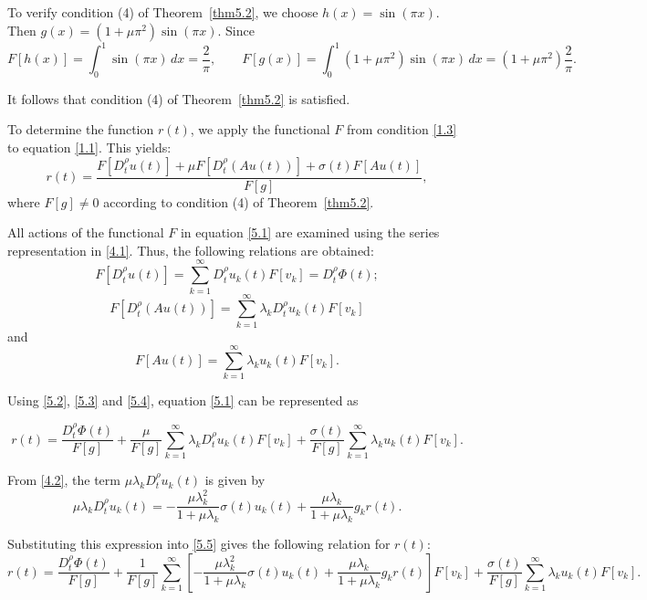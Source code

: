 \documentclass[reqno]{amsart}
\theoremstyle{definition}
\numberwithin{equation}{section}
\begin{document}
To verify condition (4) of Theorem~\ref{thm5.2}, we choose $h(x)=\sin(\pi x)$. Then $g(x)=(1+\mu\pi^2)\sin(\pi x)$. Since
$$
F[h(x)]=\int_0^1 \sin(\pi x)\,dx=\frac{2}{\pi}, \qquad F[g(x)]=\int_0^1 (1+\mu\pi^2)\sin(\pi x)\,dx=(1+\mu\pi^2)\frac{2}{\pi}.
$$

It follows that condition (4) of Theorem~\ref{thm5.2} is satisfied.

To determine the function $r(t)$, we apply the functional $F$ from condition \eqref{1.3} to equation \eqref{1.1}. This yields:
\begin{equation} \label{5.1}
 r(t)=\frac{F\left[D_t^\rho u(t)\right]+\mu F\left[D_t^\rho(A u(t))\right]+\sigma(t) F[A u(t)]}{F[g]},
\end{equation}
where $F[g] \neq 0$ according to condition (4) of Theorem~\ref{thm5.2}.

All actions of the functional $F$ in equation \eqref{5.1} are examined using the series representation in \eqref{4.1}. Thus, the following relations are obtained:
\begin{equation}\label{5.2}
  F\left[D_t^\rho u(t)\right]=\sum_{k=1}^{\infty} D_t^\rho u_k(t) F\left[v_k\right]=D_t^\rho \Phi(t);  
\end{equation}
\begin{equation}\label{5.3}
F\left[D_t^\rho(A u(t))\right]=\sum_{k=1}^{\infty} \lambda_k D_t^\rho u_k(t) F\left[v_k\right]
\end{equation}
and
\begin{equation}\label{5.4}
F[A u(t)]=\sum_{k=1}^{\infty} \lambda_k u_k(t) F\left[v_k\right].
\end{equation}

Using \eqref{5.2}, \eqref{5.3} and \eqref{5.4}, equation \eqref{5.1} can be represented as

\begin{equation}\label{5.5}
r(t)=\frac{D_t^\rho \Phi(t)}{F[g]}+\frac{\mu}{F[g]} \sum_{k=1}^{\infty} \lambda_k D_t^\rho u_k(t) F\left[v_k\right]+\frac{\sigma(t)}{F[g]} \sum_{k=1}^{\infty} \lambda_k u_k(t) F\left[v_k\right].
\end{equation}

From \eqref{4.2}, the term $\mu \lambda_k D_t^\rho u_k(t)$ is given by
$$
\mu \lambda_k D_t^\rho u_k(t)=-\frac{\mu \lambda_k^2}{1+\mu \lambda_k} \sigma(t) u_k(t)+\frac{\mu \lambda_k}{1+\mu \lambda_k} g_k r(t).
$$

Substituting this expression into \eqref{5.5} gives the following relation for $r(t)$:
$$
r(t)=\frac{D_t^\rho \Phi(t)}{F[g]}+\frac{1}{F[g]} \sum_{k=1}^{\infty}\left[-\frac{\mu \lambda_k^2}{1+\mu \lambda_k} \sigma(t) u_k(t)+\frac{\mu \lambda_k}{1+\mu \lambda_k} g_k r(t)\right] F\left[v_k\right]+\frac{\sigma(t)}{F[g]} \sum_{k=1}^{\infty} \lambda_k u_k(t) F\left[v_k\right].
$$
\end{document}
